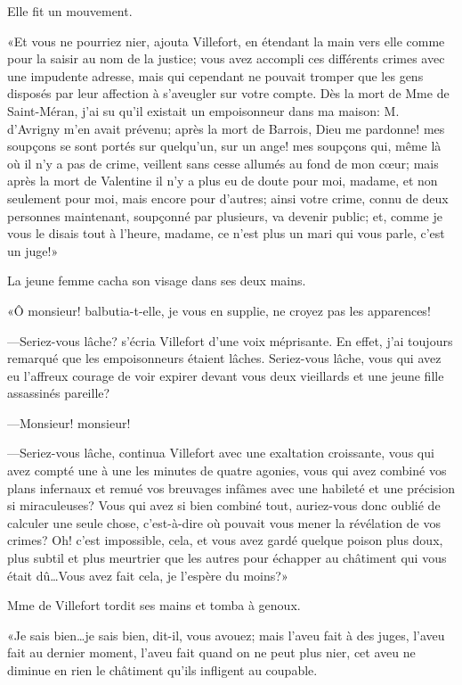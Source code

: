 Elle fit un mouvement. 

«Et vous ne pourriez nier, ajouta Villefort, en étendant la main vers elle comme pour la saisir au nom de la justice; vous avez accompli ces différents crimes avec une impudente adresse, mais qui cependant ne pouvait tromper que les gens disposés par leur affection à s'aveugler sur votre compte. Dès la mort de Mme de Saint-Méran, j'ai su qu'il existait un empoisonneur dans ma maison: M. d'Avrigny m'en avait prévenu; après la mort de Barrois, Dieu me pardonne! mes soupçons se sont portés sur quelqu'un, sur un ange! mes soupçons qui, même là où il n'y a pas de crime, veillent sans cesse allumés au fond de mon cœur; mais après la mort de Valentine il n'y a plus eu de doute pour moi, madame, et non seulement pour moi, mais encore pour d'autres; ainsi votre crime, connu de deux personnes maintenant, soupçonné par plusieurs, va devenir public; et, comme je vous le disais tout à l'heure, madame, ce n'est plus un mari qui vous parle, c'est un juge!» 

La jeune femme cacha son visage dans ses deux mains. 

«Ô monsieur! balbutia-t-elle, je vous en supplie, ne croyez pas les apparences! 

—Seriez-vous lâche? s'écria Villefort d'une voix méprisante. En effet, j'ai toujours remarqué que les empoisonneurs étaient lâches. Seriez-vous lâche, vous qui avez eu l'affreux courage de voir expirer devant vous deux vieillards et une jeune fille assassinés pareille? 

—Monsieur! monsieur! 

—Seriez-vous lâche, continua Villefort avec une exaltation croissante, vous qui avez compté une à une les minutes de quatre agonies, vous qui avez combiné vos plans infernaux et remué vos breuvages infâmes avec une habileté et une précision si miraculeuses? Vous qui avez si bien combiné tout, auriez-vous donc oublié de calculer une seule chose, c'est-à-dire où pouvait vous mener la révélation de vos crimes? Oh! c'est impossible, cela, et vous avez gardé quelque poison plus doux, plus subtil et plus meurtrier que les autres pour échapper au châtiment qui vous était dû\dots Vous avez fait cela, je l'espère du moins?» 

Mme de Villefort tordit ses mains et tomba à genoux. 

«Je sais bien\dots je sais bien, dit-il, vous avouez; mais l'aveu fait à des juges, l'aveu fait au dernier moment, l'aveu fait quand on ne peut plus nier, cet aveu ne diminue en rien le châtiment qu'ils infligent au coupable. 

